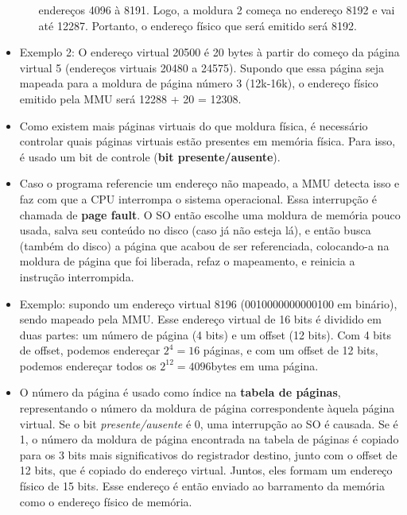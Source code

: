 \documentclass[10pt]{article}
\begin{document}
\begin{itemize}
\begin{itemize}
                endereços 4096 à 8191. Logo, a moldura 2 começa no endereço 
                8192 e vai até 12287. Portanto, o endereço físico que será
                emitido será 8192.
        \end{itemize}
    \item Exemplo 2: O endereço virtual 20500 é 20 bytes à partir do começo
        da página virtual 5 (endereços virtuais 20480 a 24575). Supondo que
        essa página seja mapeada para a moldura de página número 3 (12k-16k),
        o endereço físico emitido pela MMU será 12288 + 20 = 12308.
    \item Como existem mais páginas virtuais do que moldura física, é necessário
        controlar quais páginas virtuais estão presentes em memória física.
        Para isso, é usado um bit de controle (\textbf{bit presente/ausente}).
    \item Caso o programa referencie um endereço não mapeado, a MMU detecta isso
        e faz com que a CPU interrompa o sistema operacional. Essa interrupção
        é chamada de \textbf{page fault}. O SO então escolhe uma moldura de memória
        pouco usada, salva seu conteúdo no disco (caso já não esteja lá), e então
        busca (também do disco) a página que acabou de ser referenciada, colocando-a
        na moldura de página que foi liberada, refaz o mapeamento, e reinicia a 
        instrução interrompida.
    \item Exemplo: supondo um endereço virtual 8196 (0010000000000100 em binário),
        sendo mapeado pela MMU. Esse endereço virtual de 16 bits é dividido em
        duas partes: um número de página (4 bits) e um offset (12 bits). Com 4
        bits de offset, podemos endereçar \begin{math} 2^4 = 16\end{math} 
        páginas, e com um offset de 12 bits, podemos endereçar todos os 
        \begin{math}2^{12} = 4096 \end{math}bytes em uma página.
        \item O número da página é usado como índice na \textbf{tabela de páginas},
            representando o número da moldura de página correspondente àquela página
            virtual. Se o bit \textit{presente/ausente} é 0, uma interrupção ao SO
            é causada. Se é 1, o número da moldura de página encontrada na tabela
            de páginas é copiado para os 3 bits mais significativos do registrador
            destino, junto com o offset de 12 bits, que é copiado do endereço virtual.
            Juntos, eles formam um endereço físico de 15 bits. Esse endereço é então
            enviado ao barramento da memória como o endereço físico de memória. 
\end{itemize}
\end{document}

